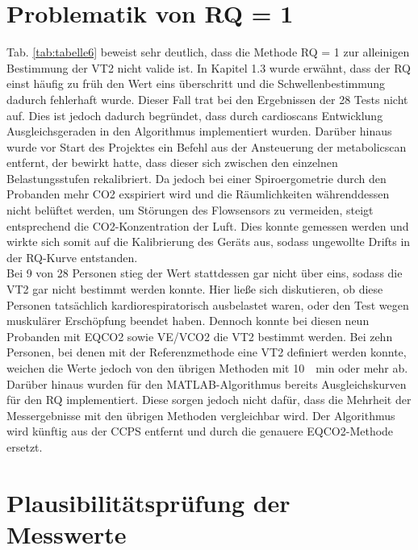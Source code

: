 \section{Problematik von RQ = 1}

Tab. \ref{tab:tabelle6} beweist sehr deutlich, dass die Methode RQ = 1 zur alleinigen Bestimmung der VT2 nicht valide ist. In Kapitel 1.3 wurde erwähnt, dass der RQ einst häufig zu früh den Wert eins überschritt und die Schwellenbestimmung dadurch fehlerhaft wurde. Dieser Fall trat bei den Ergebnissen der 28 Tests nicht auf. Dies ist jedoch dadurch begründet, dass durch cardioscans Entwicklung Ausgleichsgeraden in den Algorithmus implementiert wurden. Darüber hinaus wurde vor Start des Projektes ein Befehl aus der Ansteuerung der metabolicscan entfernt, der bewirkt hatte, dass dieser sich zwischen den einzelnen Belastungsstufen rekalibriert. Da jedoch bei einer Spiroergometrie durch den Probanden mehr \acs{CO2} exspiriert wird und die Räumlichkeiten währenddessen nicht belüftet werden, um Störungen des Flowsensors zu vermeiden, steigt entsprechend die \acs{CO2}-Konzentration der Luft. Dies konnte gemessen werden und wirkte sich somit auf die Kalibrierung des Geräts aus, sodass ungewollte Drifts in der RQ-Kurve entstanden.\\
Bei 9 von 28 Personen stieg der Wert stattdessen gar nicht über eins, sodass die VT2 gar nicht bestimmt werden konnte. Hier ließe sich diskutieren, ob diese Personen tatsächlich kardiorespiratorisch ausbelastet waren, oder den Test wegen muskulärer Erschöpfung beendet haben. Dennoch konnte bei diesen neun Probanden mit \acs{EQCO2} sowie \acs{VE}/\acs{VCO2} die VT2 bestimmt werden. Bei zehn Personen, bei denen mit der Referenzmethode eine VT2 definiert werden konnte, weichen die Werte jedoch von den übrigen Methoden mit \SI{10}{\per\minute} oder mehr ab. Darüber hinaus wurden für den MATLAB-Algorithmus bereits Ausgleichskurven für den RQ implementiert. Diese sorgen jedoch nicht dafür, dass die Mehrheit der Messergebnisse mit den übrigen Methoden vergleichbar wird. Der Algorithmus wird künftig aus der \acs{CCPS} entfernt und durch die genauere \acs{EQCO2}-Methode ersetzt.

\section{Plausibilitätsprüfung der Messwerte}

